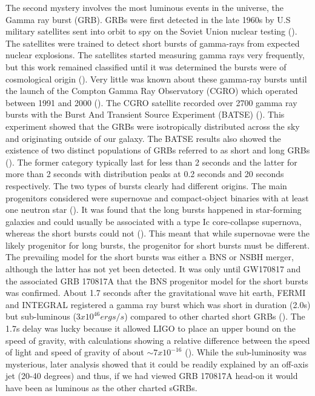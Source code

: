 The second mystery involves the most luminous events in the universe, the Gamma ray burst (GRB).  GRBs were first detected in the late 1960s by U.S military satellites sent into orbit to spy on the Soviet Union nuclear testing (\cite{klebesadel1973observations}). The satellites were trained to detect short bursts of gamma-rays from expected nuclear explosions. The satellites started measuring gamma rays very frequently, but this work remained classified until it was determined the bursts were of cosmological origin (\cite{klebesadel1973observations}). Very little was known about these gamma-ray bursts until the launch of the Compton Gamma Ray Observatory (CGRO) which operated between 1991 and 2000 (\cite{fishman1995gamma}). The CGRO satellite recorded over 2700 gamma ray bursts
with the Burst And Transient Source Experiment (BATSE) (\cite{fishman1989proc}).  This experiment showed that the GRBs were isotropically distributed across the sky and originating outside of our galaxy. The BATSE results also showed the existence of two distinct populations of GRBs referred to as short and long GRBs (\cite{kouveliotou1993identification}). The former category typically last for less than 2 seconds and the latter for more than 2 seconds with distribution peaks at 0.2 seconds and 20 seconds respectively. The two types of bursts clearly had different origins. The main progenitors considered were supernovae and compact-object binaries with at least one neutron star (\cite{levan2016gamma}). It was found that the long bursts happened in star-forming galaxies and could usually be associated with a type Ic core-collapse supernova, whereas the short bursts could not (\cite{hjorth2013supernova}). This meant that while supernovae were the likely progenitor for long bursts, the progenitor for short bursts must be different. The prevailing model for the short bursts was either a BNS or NSBH merger, although the latter has not yet been detected. It was only until GW170817 and the associated GRB 170817A that the BNS progenitor model for the short bursts was confirmed. About 1.7 seconds after the gravitational wave hit earth, FERMI and INTEGRAL registered a gamma ray burst which was short in duration (2.0s) but sub-luminous ($3x10^{46} ergs/s$) compared to other charted short GRBs (\cite{monitor:2017mdv,gbm:2017lvd}). The 1.7s delay was lucky because it allowed LIGO to place an upper bound on the speed of gravity, with calculations showing a relative difference between the speed of light and speed of gravity of about $\sim 7 x 10^{-16}$ (\cite{monitor:2017mdv}). While the sub-luminosity was mysterious, later analysis showed that it could be readily explained by an off-axis jet (20-40 degrees) and thus, if we had viewed GRB 170817A head-on it would have been as luminous as the other charted sGRBs.

